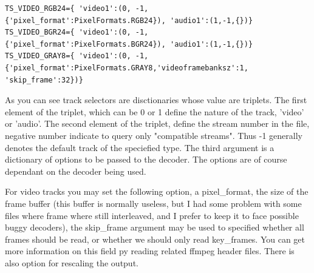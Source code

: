 \documentclass{report}
\begin{document}
\begin{lstlisting}
TS_VIDEO_RGB24={ 'video1':(0, -1, {'pixel_format':PixelFormats.RGB24}), 'audio1':(1,-1,{})}
TS_VIDEO_BGR24={ 'video1':(0, -1, {'pixel_format':PixelFormats.BGR24}), 'audio1':(1,-1,{})}
TS_VIDEO_GRAY8={ 'video1':(0, -1, {'pixel_format':PixelFormats.GRAY8,'videoframebanksz':1, 'skip_frame':32})}

\end{lstlisting}












As you can see track selectors are disctionaries whose value are triplets.
The first element of the triplet, which can be 0 or 1 define the nature of the track, 'video' or 'audio'. 
The second element of the triplet, define the stream number in the file, negative number indicate to query only "compatible streams". Thus -1 generally denotes the default track of the speciefied type.
The third argument is a dictionary of options to be passed to the decoder. The options are of course dependant on the decoder being used.

For video tracks you may set the following option, a pixel_format, the size of the frame buffer (this buffer is normally useless, but I had some problem with some files where frame where still interleaved, 
and I prefer to keep it to face possible buggy decoders), the skip_frame argument may be used to specified whether all frames should be read, or whether we should only read key_frames. You can get more information
on this field py reading related ffmpeg header files. There is also option for rescaling the output.
\end{document}
